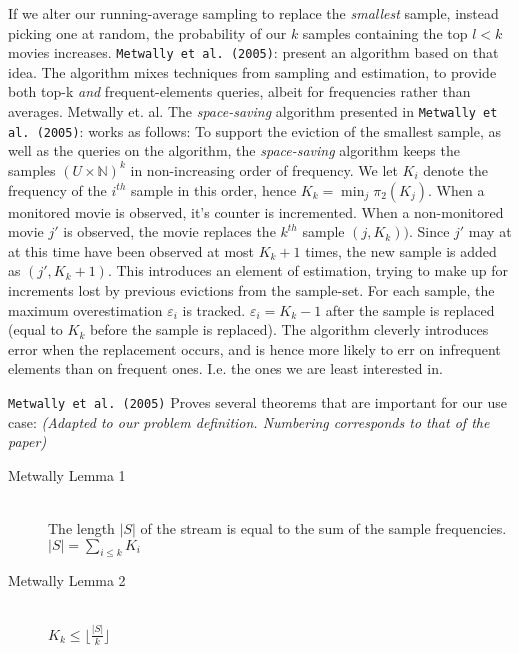{%

If we alter our running-average sampling to replace the \textit{smallest}
sample, instead picking one at random, the probability of our $k$ samples
containing the top $l<k$ movies increases. \texttt{Metwally et al. (2005)}\citep{efficientstreams}: present an
algorithm based on that idea. The algorithm mixes techniques from sampling and
estimation, to provide both top-k \textit{and} frequent-elements queries, albeit
for frequencies rather than averages.
Metwally et. al.
The \textit{space-saving} algorithm presented in \texttt{Metwally et al. (2005)}\citep{efficientstreams}: works
as follows:
To support the eviction of the smallest sample, as well as the queries on the
algorithm, the \textit{space-saving} algorithm keeps the samples $(U\times
\mathbb{N})^k$ in non-increasing order of frequency. We let $K_i$ denote the
frequency of the $i^{th}$ sample in this order, hence $K_k = \min_j\pi_2(K_j)$.
When a monitored movie is observed, it's counter is incremented. When a
non-monitored movie $j'$ is observed, the movie replaces the $k^{th}$ sample
$(j,K_k))$. Since $j'$ may at at this time have
been observed at most $K_k+1$ times, the new sample is added as $(j',K_k+1)$. This
introduces an element of estimation, trying to make up for increments lost by
previous evictions from the sample-set. For each sample, the maximum
overestimation $\varepsilon_i$ is tracked. $\varepsilon_i = K_k-1$ after the
sample is replaced (equal to $K_k$ before the sample is replaced). The algorithm
cleverly introduces error when the replacement occurs, and is hence more likely
to err on infrequent elements than on frequent ones. I.e. the ones we are least
interested in.

\texttt{Metwally et al. (2005)}\citep{efficientstreams} Proves several theorems that are important for our use
case: \textit{(Adapted to our problem definition. Numbering corresponds to that
of the paper)}
\begin{description}
\item[Metwally Lemma 1] \hfill \\
	The length $|S|$ of the stream is equal to the sum of the sample
	frequencies.
	$|S| = \sum_{i\leq k}K_i$

\item[Metwally Lemma 2] \hfill \\
	$K_k \leq \lfloor \frac{|S|}{k} \rfloor$ 


\end{description}}
